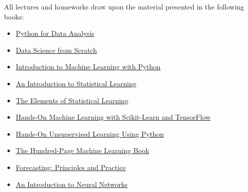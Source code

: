 \documentclass[12pt]{article}
\begin{document}
All lectures and homeworks draw upon the material presented in the following books:
\begin{itemize}
	\item \href{http://shop.oreilly.com/product/0636920023784.do}{Python for Data Analysis}
	\item \href{https://www.oreilly.com/library/view/data-science-from/9781492041122/}{Data Science from Scratch}
	\item \href{https://www.oreilly.com/library/view/introduction-to-machine/9781449369880}{Introduction to Machine Learning with Python}
	\item \href{http://www.statlearning.com}{An Introduction to Statistical Learning}
	\item \href{https://link.springer.com/book/10.1007/978-0-387-84858-7}{The Elements of Statistical Learning}
	\item \href{"https://www.oreilly.com/library/view/hands-on-machine-learning/9781491962282/}{Hands-On Machine Learning with Scikit-Learn and TensorFlow}
	\item \href{https://www.oreilly.com/library/view/hands-on-unsupervised-learning/9781492035633/}{Hands-On Unsupervised Learning Using Python}
	\item \href{http://themlbook.com}{The Hundred-Page Machine Learning Book}
	\item \href{https://otexts.com/fpp2/}{Forecasting: Principles and Practice}
	\item \href{https://link.springer.com/chapter/10.1007/978-3-319-94463-0_1}{An Introduction to Neural Networks}
\end{itemize}
	
\end{document}

